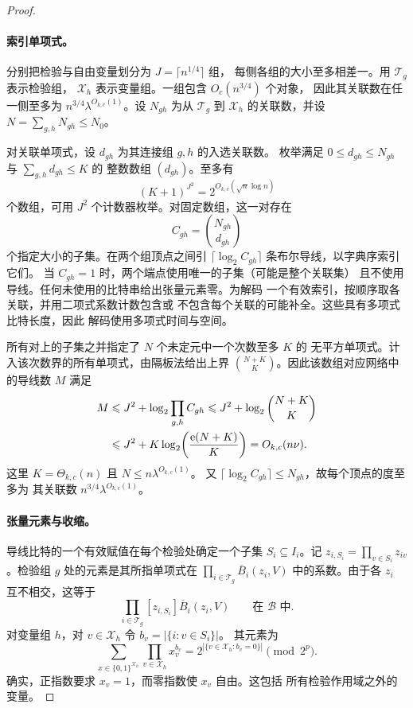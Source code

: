 \begin{proof}
\paragraph{索引单项式。}
分别把检验与自由变量划分为 $J=\lceil n^{1/4}\rceil$ 组，
每侧各组的大小至多相差一。用 $\mathcal T_g$ 表示检验组，
$\mathcal X_h$ 表示变量组。一组包含 $O_c(n^{3/4})$ 个对象，
因此其关联数在任一侧至多为
$n^{3/4}\lambda^{O_{k,c}(1)}$。设 $N_{gh}$ 为从 $\mathcal T_g$ 到
$\mathcal X_h$ 的关联数，并设 $N=\sum_{g,h}N_{gh}\le N_0$。

对关联单项式，设 $d_{gh}$ 为其连接组 $g,h$ 的入选关联数。
枚举满足 $0\le d_{gh}\le N_{gh}$ 与 $\sum_{g,h}d_{gh}\le K$ 的
整数数组 $(d_{gh})$。至多有
\[
 (K+1)^{J^2}=2^{O_{k,c}(\sqrt n\log n)}
\]
个数组，可用 $J^2$ 个计数器枚举。对固定数组，这一对存在
\[
 C_{gh}=\binom{N_{gh}}{d_{gh}}
\]
个指定大小的子集。在两个组顶点之间引
$\lceil\log_2 C_{gh}\rceil$ 条布尔导线，以字典序索引它们。
当 $C_{gh}=1$ 时，两个端点使用唯一的子集（可能是整个关联集）
且不使用导线。任何未使用的比特串给出张量元素零。为解码
一个有效索引，按顺序取各关联，并用二项式系数计数包含或
不包含每个关联的可能补全。这些具有多项式比特长度，因此
解码使用多项式时间与空间。

所有对上的子集之并指定了 $N$ 个未定元中一个次数至多 $K$ 的
无平方单项式。计入该次数界的所有单项式，由隔板法给出上界
$\binom{N+K}{K}$。因此该数组对应网络中的导线数 $M$ 满足
\begin{align}
 M &\le J^2+\log_2\prod_{g,h} C_{gh}
      \le J^2+\log_2\binom{N+K}{K} \notag\\
   &\le J^2+K\log_2\!\left(\frac{\mathrm e(N+K)}{K}\right)
      = O_{k,c}(n\nu).
 \label{eq:sharp-wire-budget}
\end{align}
这里 $K=\Theta_{k,c}(n)$ 且 $N\le n\lambda^{O_{k,c}(1)}$。
又 $\lceil\log_2 C_{gh}\rceil\le N_{gh}$，故每个顶点的度至多为
其关联数 $n^{3/4}\lambda^{O_{k,c}(1)}$。

\paragraph{张量元素与收缩。}
导线比特的一个有效赋值在每个检验处确定一个子集
$S_i\subseteq I_i$。记 $z_{i,S_i}=\prod_{v\in S_i}z_{iv}$。检验组
$g$ 处的元素是其所指单项式在
$\prod_{i\in\mathcal T_g}\overline B_i(z_i,V)$ 中的系数。由于各
$z_i$ 互不相交，这等于
\[
 \prod_{i\in\mathcal T_g}[z_{i,S_i}]\overline B_i(z_i,V)
 \qquad\text{在 }\mathcal B\text{ 中}.
\]
对变量组 $h$，对 $v\in\mathcal X_h$ 令 $b_v=|\{i:v\in S_i\}|$。
其元素为
\[
 \sum_{x\in\{0,1\}^{\mathcal X_h}}
        \prod_{v\in\mathcal X_h}x_v^{b_v}
   =2^{|\{v\in\mathcal X_h:b_v=0\}|}\pmod{2^p}.
\]
确实，正指数要求 $x_v=1$，而零指数使 $x_v$ 自由。这包括
所有检验作用域之外的变量。


\end{proof}
